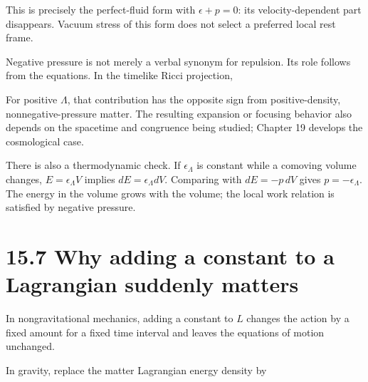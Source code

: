 \documentclass[
  11pt,
  letterpaper,
  oneside,
  openany]{scrbook}
\begin{document}
This is precisely the perfect-fluid form with \(\epsilon+p=0\): its
velocity-dependent part disappears. Vacuum stress of this form does not
select a preferred local rest frame.

Negative pressure is not merely a verbal synonym for repulsion. Its role
follows from the equations. In the timelike Ricci projection,

\begin{center}
\begingroup
{}
\ifdim\wd\grmathbox>\linewidth
\resizebox{\linewidth}{!}{\usebox{\grmathbox}}
\else\usebox{\grmathbox}\fi
\endgroup
\end{center}

For positive \(\Lambda\), that contribution has the opposite sign from
positive-density, nonnegative-pressure matter. The resulting expansion
or focusing behavior also depends on the spacetime and congruence being
studied; Chapter 19 develops the cosmological case.

There is also a thermodynamic check. If \(\epsilon_\Lambda\) is constant
while a comoving volume changes, \(E=\epsilon_\Lambda V\) implies
\(dE=\epsilon_\Lambda dV\). Comparing with \(dE=-p\,dV\) gives
\(p=-\epsilon_\Lambda\). The energy in the volume grows with the volume;
the local work relation is satisfied by negative pressure.

\hypertarget{why-adding-a-constant-to-a-lagrangian-suddenly-matters}{%
\section{15.7 Why adding a constant to a Lagrangian suddenly
matters}\label{why-adding-a-constant-to-a-lagrangian-suddenly-matters}}

In nongravitational mechanics, adding a constant to \(L\) changes the
action by a fixed amount for a fixed time interval and leaves the
equations of motion unchanged.

In gravity, replace the matter Lagrangian energy density by

\begin{center}
\begingroup
{}
\ifdim\wd\grmathbox>\linewidth
\resizebox{\linewidth}{!}{\usebox{\grmathbox}}
\else\usebox{\grmathbox}\fi
\endgroup
\end{center}
\end{document}
